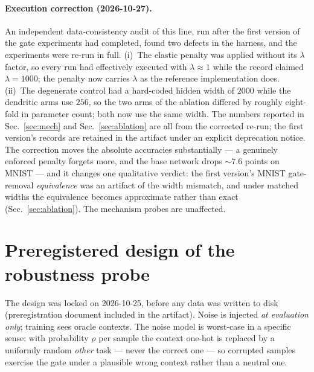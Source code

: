 \documentclass[10pt]{article}
\begin{document}
\paragraph{Execution correction (2026-10-27).}
An independent data-consistency audit of this line, run after the first
version of the gate experiments had completed, found two defects in the
harness, and the experiments were re-run in full. (i)~The elastic penalty
was applied without its $\lambda$ factor, so every run had effectively
executed with $\lambda \approx 1$ while the record claimed
$\lambda{=}1000$; the penalty now carries $\lambda$ as the reference
implementation does. (ii)~The degenerate control had a hard-coded hidden
width of $2000$ while the dendritic arms use $256$, so the two arms of the
ablation differed by roughly eight-fold in parameter count; both now use
the same width. The numbers reported in Sec.~\ref{sec:mech} and
Sec.~\ref{sec:ablation} are all from the corrected re-run; the first
version's records are retained in the artifact under an explicit
deprecation notice. The correction moves the absolute accuracies
substantially --- a genuinely enforced penalty forgets more, and the base
network drops ${\sim}7.6$ points on MNIST --- and it changes one qualitative
verdict: the first version's MNIST gate-removal \emph{equivalence} was an
artifact of the width mismatch, and under matched widths the equivalence
becomes approximate rather than exact (Sec.~\ref{sec:ablation}). The
mechanism probes are unaffected.


\section{Preregistered design of the robustness probe}
\label{sec:design}

The design was locked on 2026-10-25, before any data was written to disk
(preregistration document included in the artifact). Noise is injected
\emph{at evaluation only}; training sees oracle contexts. The noise model
is worst-case in a specific sense: with probability $\rho$ per sample the
context one-hot is replaced by a uniformly random \emph{other} task ---
never the correct one --- so corrupted samples exercise the gate under a
plausible wrong context rather than a neutral one.
\end{document}
